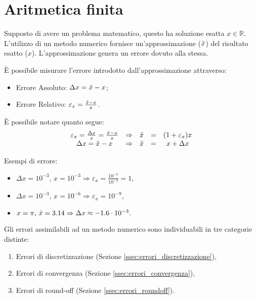 \section{Aritmetica finita}\label{sec:aritmetica_finita}
Supposto di avere un problema matematico, questo ha soluzione esatta $x \in\mathbb R$. L'utilizzo di un \gls{metodo numerico} fornisce un'approssimazione ($\Tilde{x}$) del risultato esatto ($x$). L'approssimazione genera un errore dovuto alla stessa.

È possibile misurare l'errore introdotto dall'approssimazione attraverso:
\begin{itemize}
	\item Errore Assoluto: $\Delta x = \Tilde{x}-x$;
	\item Errore Relativo: $\varepsilon_x=\frac{\Tilde{x}-x}{x}$. 
\end{itemize}

È possibile notare quanto segue:
\begin{equation*}
	\begin{matrix}
		\varepsilon_x=\frac{\Delta x}{x}=\frac{\Tilde{x}-x}{x} & \Rightarrow & \Tilde{x} &=& (1+\varepsilon_x)x\\
		\Delta  x = \Tilde{x}-x & \Rightarrow & \Tilde{x}&=& x+\Delta x
	\end{matrix}
\end{equation*}

\begin{example}
	Esempi di errore:
	\begin{itemize}
		\item $\Delta x = 10^{-3},\, x=10^{-3}\Rightarrow \varepsilon_x = \frac{10^{-3}}{10^{-3}} = 1$,
		\item  $\Delta x = 10^{-3},\, x=10^{-6}\Rightarrow\varepsilon_x = 10^{-9}$,
		\item $x=\pi,\,\Tilde{x}=3.14 \Rightarrow\Delta x \approx -1.6\cdot 10^{-3}.$
	\end{itemize}
\end{example}

Gli errori assimilabili ad un \gls{metodo numerico} sono individuabili in tre categorie distinte:
\begin{enumerate}
	\item Errori di discretizzazione (Sezione \ref{ssec:errori_discretizzazione}),
	\item Errori di convergenza (Sezione \ref{ssec:errori_convergenza}),
	\item Errori di round-off (Sezione \ref{ssec:errori_roundoff}).
\end{enumerate}

